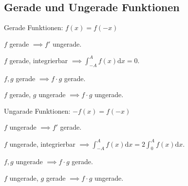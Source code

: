 \subsection{Gerade und Ungerade Funktionen}
\begin{compactdesc}
    \item[Gerade Funktionen:] $f(x) = f(-x)$
        \begin{compactitem}
            \item $f$ gerade $\implies f'$ ungerade.
            \item $f$ gerade, integrierbar $\implies \int_{-A}^{A} f(x) \mathrm{d}x = 0$.
            \item $f, g$ gerade $\implies f \cdot g$ gerade.
            \item $f$ gerade, $g$ ungerade $\implies f \cdot g$ ungerade.
        \end{compactitem}
    \item[Ungarade Funktionen:] $-f(x) = f(-x)$
        \begin{compactitem}
            \item $f$ ungerade $\implies f'$ gerade.
            \item $f$ ungerade, integrierbar $\implies \int_{-A}^{A} f(x) \mathrm{d}x = 2 \int_{0}^{A} f(x) \mathrm{d}x$.
            \item $f, g$ ungerade $\implies f \cdot g$ gerade.
            \item $f$ ungerade, $g$ gerade $\implies f \cdot g$ ungerade.
        \end{compactitem}
\end{compactdesc}
